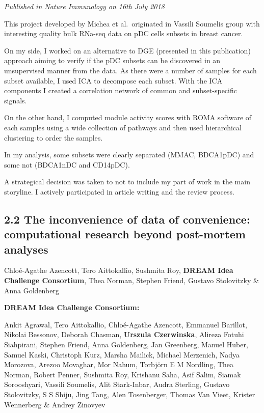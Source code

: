 \documentclass[12pt,]{book}
\theoremstyle{definition}
\theoremstyle{definition}
\theoremstyle{definition}
\theoremstyle{remark}
\begin{document}
\emph{Published in Nature Immunology on 16th July 2018}

This project developed by Michea et al.~originated in Vassili Soumelis
group with interesting quality bulk RNa-seq data on pDC cells subsets in
breast cancer.

On my side, I worked on an alternative to DGE (presented in this
publication) approach aiming to verify if the pDC subsets can be
discovered in an unsupervised manner from the data. As there were a
number of samples for each subset available, I used ICA to decompose
each subset. With the ICA components I created a correlation network of
common and subset-specific signals.

On the other hand, I computed module activity scores with ROMA software
\citep{Martignetti2016} of each samples using a wide collection of
pathways and then used hierarchical clustering to order the samples.

In my analysis, some subsets were clearly separated (MMAC, BDCA1pDC) and
some not (BDCA1nDC and CD14pDC).

A strategical decision was taken to not to include my part of work in
the main storyline. I actively participated in article writing and the
review process.



\newpage

\hypertarget{the-inconvenience-of-data-of-convenience-computational-research-beyond-post-mortem-analyses}{%
\subsection*{2.2 The inconvenience of data of convenience: computational
research beyond post-mortem
analyses}\label{the-inconvenience-of-data-of-convenience-computational-research-beyond-post-mortem-analyses}}

Chloé-Agathe Azencott, Tero Aittokallio, Sushmita Roy, \textbf{DREAM
Idea Challenge Consortium}, Thea Norman, Stephen Friend, Gustavo
Stolovitzky \& Anna Goldenberg

\textbf{DREAM Idea Challenge Consortium:}

Ankit Agrawal, Tero Aittokallio, Chloé-Agathe Azencott, Emmanuel
Barillot, Nikolai Bessonov, Deborah Chasman, \textbf{Urszula
Czerwinska}, Alireza Fotuhi Siahpirani, Stephen Friend, Anna Goldenberg,
Jan Greenberg, Manuel Huber, Samuel Kaski, Christoph Kurz, Marsha
Mailick, Michael Merzenich, Nadya Morozova, Arezoo Movaghar, Mor Nahum,
Torbjörn E M Nordling, Thea Norman, Robert Penner, Sushmita Roy,
Krishanu Saha, Asif Salim, Siamak Sorooshyari, Vassili Soumelis, Alit
Stark-Inbar, Audra Sterling, Gustavo Stolovitzky, S S Shiju, Jing Tang,
Alen Tosenberger, Thomas Van Vieet, Krister Wennerberg \& Andrey
Zinovyev
\end{document}
